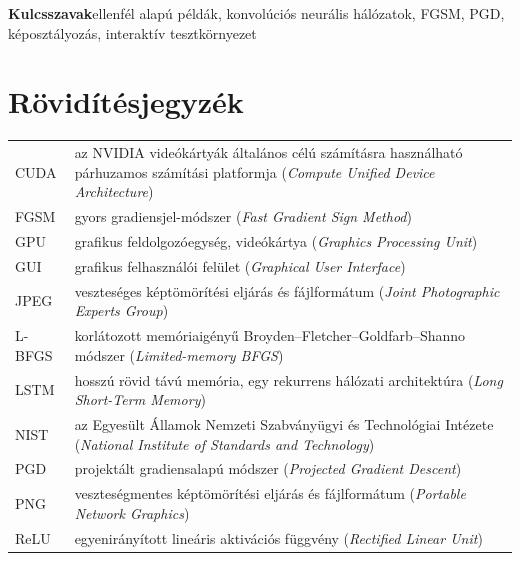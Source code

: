 \documentclass[
]{elteikthesis}[2024/04/26]
\begin{document}
\vspace{0.5em}
\noindent\textbf{Kulcsszavak}\quad ellenfél alapú példák, konvolúciós neurális hálózatok, FGSM, PGD, képosztályozás, interaktív tesztkörnyezet

\cleardoublepage

\tableofcontents
\cleardoublepage

\chapter*{Rövidítésjegyzék}

\begin{longtable}{@{}l p{}@{}}
CUDA & az NVIDIA videókártyák általános célú számításra használható párhuzamos számítási platformja (\textit{Compute Unified Device Architecture}) \\
FGSM & gyors gradiensjel-módszer (\textit{Fast Gradient Sign Method}) \\
GPU & grafikus feldolgozóegység, videókártya (\textit{Graphics Processing Unit}) \\
GUI & grafikus felhasználói felület (\textit{Graphical User Interface}) \\
JPEG & veszteséges képtömörítési eljárás és fájlformátum (\textit{Joint Photographic Experts Group}) \\
L-BFGS & korlátozott memóriaigényű Broyden--Fletcher--Goldfarb--Shanno módszer (\textit{Limited-memory BFGS}) \\
LSTM & hosszú rövid távú memória, egy rekurrens hálózati architektúra (\textit{Long Short-Term Memory}) \\
NIST & az Egyesült Államok Nemzeti Szabványügyi és Technológiai Intézete (\textit{National Institute of Standards and Technology}) \\
PGD & projektált gradiensalapú módszer (\textit{Projected Gradient Descent}) \\
PNG & veszteségmentes képtömörítési eljárás és fájlformátum (\textit{Portable Network Graphics}) \\
ReLU & egyenirányított lineáris aktivációs függvény (\textit{Rectified Linear Unit}) \\
\end{longtable}

\cleardoublepage


\cleardoublepage

{}
\printbibliography[title=\biblabel]
\cleardoublepage
\end{document}
